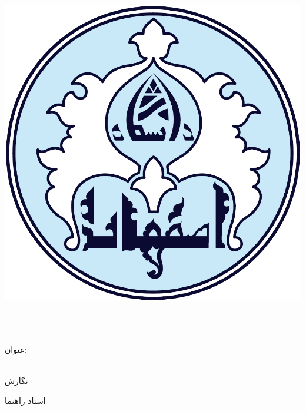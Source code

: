 
\begin{center}

\includegraphics[scale=0.2]{logo.pdf}

\vspace{0.5cm}
\ThesisUniversity \\[-0.3em]
\vspace{0.5cm}
\ThesisDepartment\\

\begin{large}
\vspace{0.5cm}



\end{large}

\vspace{1.5cm}

{عنوان:}\\[1.2em]
{\LARGE\textbf{\ThesisTitle}}\\ 
\vspace{1cm}
\begin{latin}
{\Large\textbf\EnglishThesisTitle}
\end{latin}

\vspace{2cm}

{نگارش}\\[.5em]
{\large\textbf{\ThesisAuthor}}

\vspace{1.5cm}

{استاد راهنما}\\[.5em]
{\large\textbf{\ThesisSupervisor}}

\vspace{1cm}



\vspace{2cm}

\ThesisDate

\end{center}

\newpage
